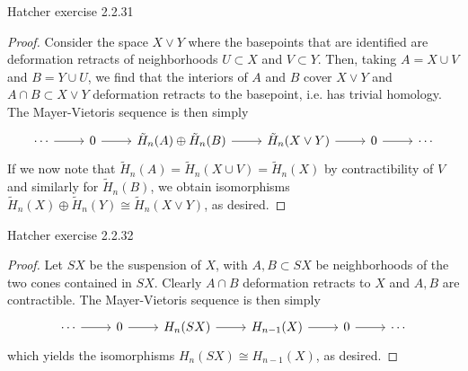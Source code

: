 \documentclass{../../mathnotes}
\begin{document}
\begin{prop}
    Hatcher exercise 2.2.31
\end{prop}
\begin{proof}
    Consider the space $X\vee Y$ where the basepoints that are identified are deformation retracts
    of neighborhoods $U\subset X$ and $V\subset Y$. Then, taking $A=X\cup V$ and $B=Y\cup U$, we find
    that the interiors of $A$ and $B$ cover $X\vee Y$ and $A\cap B\subset X\vee Y$ deformation retracts
    to the basepoint, i.e. has trivial homology.
    The Mayer-Vietoris sequence is then simply
    \begin{equation*}
        \begin{tikzcd}
            \cdots\ar{r} & 0\ar{r} & \tilde H_n(A)\oplus \tilde H_n(B)\ar{r} & \tilde H_n(X\vee Y)\ar{r} & 0\ar{r} & \cdots
        \end{tikzcd}
    \end{equation*}
    If we now note that $\tilde H_n(A)=\tilde H_n(X\cup V)=\tilde H_n(X)$ by contractibility of $V$ and similarly for $\tilde H_n(B)$,
    we obtain isomorphisms $\tilde H_n(X)\oplus \tilde H_n(Y)\cong \tilde H_n(X\vee Y)$, as desired.
\end{proof}

\begin{prop}
    Hatcher exercise 2.2.32
\end{prop}
\begin{proof}
    Let $SX$ be the suspension of $X$, with $A,B\subset SX$ be neighborhoods of the two cones contained
    in $SX$. Clearly $A\cap B$ deformation retracts to $X$ and $A,B$ are contractible. The Mayer-Vietoris sequence
    is then simply
    \begin{equation*}
        \begin{tikzcd}
            \cdots\ar{r} & 0\ar{r} & H_n(SX)\ar{r} & H_{n-1}(X)\ar{r} & 0\ar{r} & \cdots
        \end{tikzcd}
    \end{equation*}
    which yields the isomorphisms $H_n(SX)\cong H_{n-1}(X)$, as desired.
\end{proof}
\end{document}
